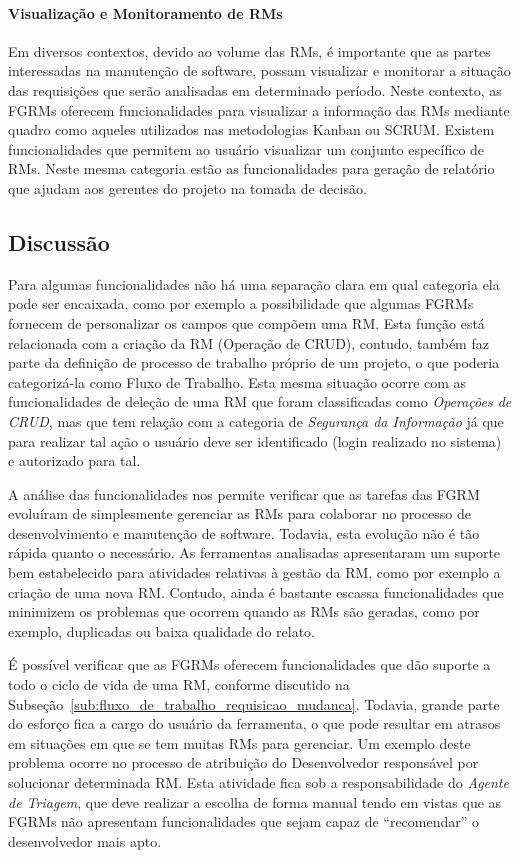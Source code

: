\paragraph{Visualização e Monitoramento de RMs}
\label{par:visualização_de_rm_s}

Em diversos contextos, devido ao volume das RMs, é importante que as partes
interessadas na manutenção de software, possam visualizar e monitorar a situação
das requisições que serão analisadas em determinado período. Neste contexto, as
FGRMs oferecem funcionalidades para visualizar a informação das RMs mediante
quadro como aqueles utilizados nas metodologias Kanban ou SCRUM\@. Existem
funcionalidades que permitem ao usuário visualizar um conjunto específico de
RMs. Neste mesma categoria estão as funcionalidades para geração de relatório
que ajudam aos gerentes do projeto na tomada de decisão.

\subsection{Discussão}
\label{sec:discussao}

Para algumas funcionalidades não há uma separação clara em qual categoria ela
pode ser encaixada, como por exemplo a possibilidade que algumas FGRMs fornecem
de personalizar os campos que compõem uma RM\@. Esta função está relacionada com
a criação da RM (Operação de CRUD), contudo, também faz parte da definição de
processo de trabalho próprio de um projeto, o que poderia categorizá-la como
Fluxo de Trabalho. Esta mesma situação ocorre com as funcionalidades de deleção
de uma RM que foram classificadas como \textit{Operações de CRUD}, mas que tem
relação com a categoria de \textit{Segurança da Informação} já que para realizar
tal ação o usuário deve ser identificado (login realizado no sistema) e
autorizado para tal.

A análise das funcionalidades nos permite verificar que as tarefas das FGRM
evoluíram de simplesmente gerenciar as RMs para colaborar no processo de
desenvolvimento e manutenção de software. Todavia, esta evolução não é tão
rápida quanto o necessário. As ferramentas analisadas apresentaram um suporte
bem estabelecido para atividades relativas à gestão da RM, como por exemplo a
criação de uma nova RM\@. Contudo, ainda é bastante escassa funcionalidades que
minimizem os problemas que ocorrem quando as RMs são geradas, como por exemplo,
duplicadas ou baixa qualidade do relato.

É possível verificar que as FGRMs oferecem funcionalidades que dão suporte a
todo o ciclo de vida de uma RM, conforme discutido na
Subseção~\ref{sub:fluxo_de_trabalho_requisicao_mudanca}. Todavia, grande parte
do esforço fica a cargo do usuário da ferramenta, o que pode resultar em atrasos
em situações em que se tem muitas RMs para gerenciar. Um exemplo deste problema
ocorre no processo de atribuição do Desenvolvedor responsável por solucionar
determinada RM\@. Esta atividade fica sob a responsabilidade do \textit{Agente
    de Triagem}, que deve realizar a escolha de forma manual tendo em vistas que
as FGRMs não apresentam funcionalidades que sejam capaz de ``recomendar'' o
desenvolvedor mais apto.

